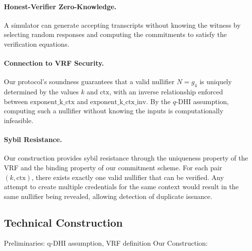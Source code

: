 \paragraph{Honest-Verifier Zero-Knowledge.} A simulator can generate accepting transcripts without knowing the witness by selecting random responses and computing the commitments to satisfy the verification equations.

\paragraph{Connection to VRF Security.} Our protocol's soundness guarantees that a valid nullifier $N = g_4$ is uniquely determined by the values $k$ and $\text{ctx}$, with an inverse relationship enforced between $\text{exponent\_k\_ctx}$ and $\text{exponent\_k\_ctx\_inv}$. By the $q$-DHI assumption, computing such a nullifier without knowing the inputs is computationally infeasible.

\paragraph{Sybil Resistance.} Our construction provides sybil resistance through the uniqueness property of the VRF and the binding property of our commitment scheme. For each pair $(k, \text{ctx})$, there exists exactly one valid nullifier that can be verified. Any attempt to create multiple credentials for the same context would result in the same nullifier being revealed, allowing detection of duplicate issuance.

































\subsection{Technical Construction}

Preliminaries: q-DHI assumption, VRF definition
Our Construction:

